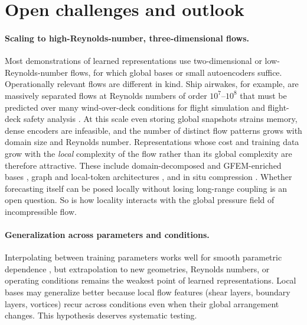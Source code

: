\section{Open challenges and outlook}
\label{sec:outlook}

\paragraph{Scaling to high-Reynolds-number, three-dimensional flows.}
Most demonstrations of learned representations use two-dimensional or
low-Reynolds-number flows, for which global bases or small autoencoders
suffice. Operationally relevant flows are different in kind. Ship airwakes,
for example, are massively separated flows at Reynolds numbers of order
$10^{7}$--$10^{8}$ that must be predicted over many wind-over-deck conditions
for flight simulation and flight-deck safety analysis
\parencite{polsky2016safedi}. At this scale even storing global snapshots
strains memory, dense encoders are infeasible, and the number of
distinct flow patterns grows with domain size and Reynolds number.
Representations whose cost and training data grow with the \emph{local}
complexity of the flow rather than its global complexity are therefore
attractive. These include domain-decomposed and GFEM-enriched bases
\parencite{hoang2021ddlspg,diaz2024ddnm,deshmukh2020dls}, graph and
local-token architectures \parencite{barwey2023multiscale,serrano2024aroma},
and in situ compression \parencite{glaws2020insitu}. Whether forecasting
itself can be posed locally without losing long-range coupling is an open
question. So is how locality interacts with the global pressure field of
incompressible flow.

\paragraph{Generalization across parameters and conditions.}
Interpolating between training parameters works well for smooth parametric
dependence \parencite{amsallem2008grassmann,fries2022lasdi}, but extrapolation to
new geometries, Reynolds numbers, or operating conditions remains the weakest
point of learned representations. Local bases may generalize better because
local flow features (shear layers, boundary layers, vortices) recur across
conditions even when their global arrangement changes. This hypothesis
deserves systematic testing.

